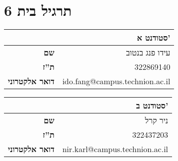 \documentclass[
  a4paper,
]{article}
\author{}
\date{}
\begin{document}
\setRTL

\NewCoffin\Output   %
\NewCoffin\Callout %
\NewCoffin\BackFrame %
\NewCoffin\SideRule  %


\newcommand{\SetCallout}[2]{%
    \SetHorizontalCoffin\Output{} %
    \SetVerticalCoffin\Callout{\linewidth-20pt}{\textbf{#1} #2}

    \SetHorizontalCoffin\BackFrame{
      \begingroup
      \color{green!30!gray!15}\rule{\linewidth}{\CoffinTotalHeight\Callout + \baselineskip}
      \endgroup
    }    
    \SetHorizontalCoffin\SideRule{
      \begingroup  
      \color{green!50!black}\rule{3pt}{\CoffinTotalHeight\Callout +\baselineskip}
      \endgroup
    } %

    \JoinCoffins*\Output[l,t]\Callout[l,t](10pt,-\baselineskip) %
    \JoinCoffins*\Output[l,t]\SideRule[l,t] %
    \JoinCoffins*\Output[l,t]\BackFrame[l,t] %
    \noindent\TypesetCoffin\Output %
    \vspace*{\CoffinTotalHeight\Callout}\bigskip %
}

\section{תרגיל בית 6}\label{ux5eaux5e8ux5d2ux5d9ux5dc-ux5d1ux5d9ux5ea-6}

\begin{longtable}[]{@{}rr@{}}
\toprule\noalign{}
& סטודנט א' \\
\midrule\noalign{}
\endhead
\bottomrule\noalign{}
\endlastfoot
\textbf{שם} & עידו פנג בנטוב \\
\textbf{ת''ז} & 322869140 \\
\textbf{דואר אלקטרוני} & ido.fang@campus.technion.ac.il \\
\end{longtable}

\begin{longtable}[]{@{}rr@{}}
\toprule\noalign{}
& סטודנט ב' \\
\midrule\noalign{}
\endhead
\bottomrule\noalign{}
\endlastfoot
\textbf{שם} & ניר קרל \\
\textbf{ת''ז} & 322437203 \\
\textbf{דואר אלקטרוני} & nir.karl@campus.technion.ac.il \\
\end{longtable}
\end{document}
